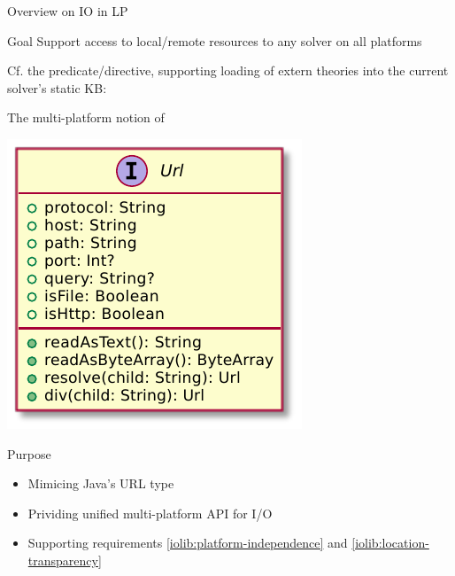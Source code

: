 \documentclass[handout]{beamer}
\begin{document}
\begin{frame}[allowframebreaks]{Overview on IO in LP}
    \framebreak

    \begin{block}{Goal}
        \centering
        Support access to local/remote resources to any solver on all platforms
    \end{block}

    \medskip

    Cf. the  predicate/directive, supporting loading of extern theories into the current solver's static KB:

\end{frame}

\begin{frame}[allowframebreaks]{The multi-platform notion of }
    \begin{center}
        \includegraphics[width=.5\linewidth]{img/url.pdf}
    \end{center}

    \begin{block}{Purpose}
        \begin{itemize}
            \item Mimicing Java's URL type
            \item Prividing unified multi-platform API for I/O
            \item Supporting requirements \ref{iolib:platform-independence} and \ref{iolib:location-transparency} 
        \end{itemize}
    \end{block}
\end{frame}
\end{document}
